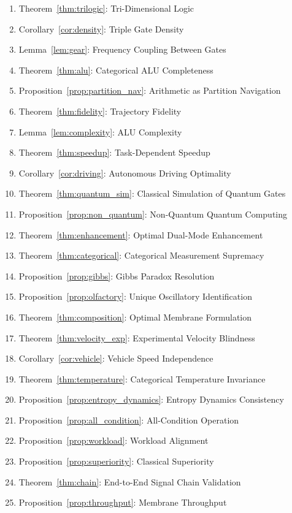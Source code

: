 \documentclass[12pt]{article}
\theoremstyle{definition}
\theoremstyle{remark}
\begin{document}
\begin{enumerate}
    \item Theorem~\ref{thm:trilogic}: Tri-Dimensional Logic
    \item Corollary~\ref{cor:density}: Triple Gate Density
    \item Lemma~\ref{lem:gear}: Frequency Coupling Between Gates
    \item Theorem~\ref{thm:alu}: Categorical ALU Completeness
    \item Proposition~\ref{prop:partition_nav}: Arithmetic as Partition Navigation
    \item Theorem~\ref{thm:fidelity}: Trajectory Fidelity
    \item Lemma~\ref{lem:complexity}: ALU Complexity
    \item Theorem~\ref{thm:speedup}: Task-Dependent Speedup
    \item Corollary~\ref{cor:driving}: Autonomous Driving Optimality
    \item Theorem~\ref{thm:quantum_sim}: Classical Simulation of Quantum Gates
    \item Proposition~\ref{prop:non_quantum}: Non-Quantum Quantum Computing
    \item Theorem~\ref{thm:enhancement}: Optimal Dual-Mode Enhancement
    \item Theorem~\ref{thm:categorical}: Categorical Measurement Supremacy
    \item Proposition~\ref{prop:gibbs}: Gibbs Paradox Resolution
    \item Proposition~\ref{prop:olfactory}: Unique Oscillatory Identification
    \item Theorem~\ref{thm:composition}: Optimal Membrane Formulation
    \item Theorem~\ref{thm:velocity_exp}: Experimental Velocity Blindness
    \item Corollary~\ref{cor:vehicle}: Vehicle Speed Independence
    \item Theorem~\ref{thm:temperature}: Categorical Temperature Invariance
    \item Proposition~\ref{prop:entropy_dynamics}: Entropy Dynamics Consistency
    \item Proposition~\ref{prop:all_condition}: All-Condition Operation
    \item Proposition~\ref{prop:workload}: Workload Alignment
    \item Proposition~\ref{prop:superiority}: Classical Superiority
    \item Theorem~\ref{thm:chain}: End-to-End Signal Chain Validation
    \item Proposition~\ref{prop:throughput}: Membrane Throughput
\end{enumerate}
\end{document}
